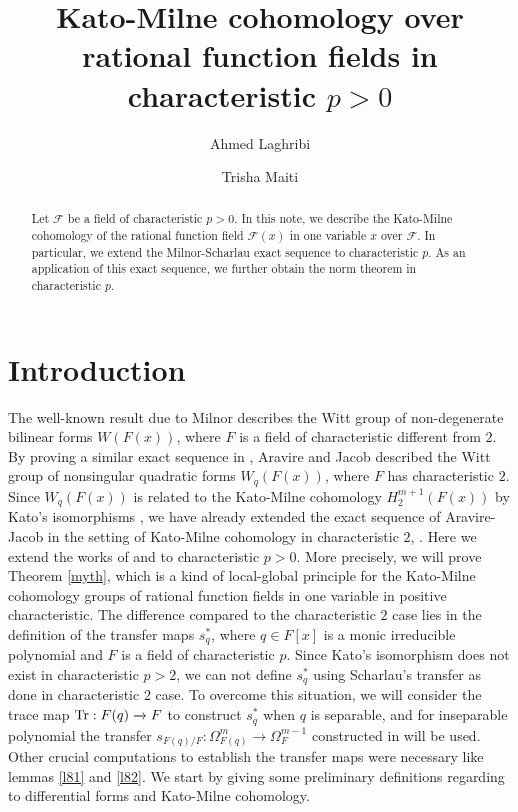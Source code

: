 \documentclass[times,10pt]{amsart}
\date{}
\title{Kato-Milne cohomology over rational function fields in characteristic $p>0$}
\author{Ahmed Laghribi}
\author{Trisha Maiti}
\newcommand{\F}{\ensuremath{\mathcal{F}}}
\begin{document}
\maketitle

\begin{abstract}
     Let $\F$ be a field 
 of characteristic $p>0$. In this note, we describe the Kato-Milne cohomology of  the  rational function field $\F(x)$ in one variable   $x$ over $\F$.  In particular, we extend  the  Milnor-Scharlau exact sequence \cite[Theorem 5.2]{Laghribi-Maiti}  to  characteristic $p$. As an application of this exact sequence, we further obtain  the norm theorem \cite[Theorem A.3]{Appendix} in characteristic $p$.
\end{abstract}



  



  
\section{Introduction}\label{s1}
   { The well-known  result \cite[Theorem 5.3]{M} due to Milnor describes the Witt group of non-degenerate bilinear forms $W(F(x))$, where  $F$ is  a field of  characteristic  different from  $2$.  By proving a similar exact sequence in \cite[Theorem 6.2]{AJ}, Aravire and Jacob  described the Witt group of nonsingular quadratic forms $W_q(F(x))$, where  $F$ has characteristic  $2$.  Since $W_q(F(x))$ is   related to  the Kato-Milne cohomology $ H_2^{m+1}(F(x))$ by Kato's isomorphisms \cite[equation (1.2)]{ex},  we  have already  extended the exact sequence of  Aravire-Jacob in the setting of Kato-Milne cohomology in characteristic $2$, \cite[Theorem 5.2]{Laghribi-Maiti}.  Here we extend  the works of  
      \cite{ex} and \cite{Laghribi-Maiti} to characteristic $p>0$.}  {More precisely, we will prove} Theorem \ref{myth}, which is a kind of local-global principle for the Kato-Milne cohomology groups of rational function fields in one variable in  positive characteristic.  {The difference compared to the characteristic $2$ case lies in the definition of the transfer maps $ s_q^*$, where $q\in F[x]$ is a monic irreducible polynomial and  $F$ is a field of characteristic $p$.}  Since Kato's isomorphism \cite[equation (1.2)]{ex} does not exist in characteristic  $p>2$, we can not define $s_q^*$ using Scharlau's transfer as done {in characteristic $2$ case}. {To overcome this situation, we will consider the trace map ${\rm Tr}: F(q)\xrightarrow{} F$ to construct $s_q^*$ when $q$ is separable, and for inseparable polynomial the transfer  $s_{F(q)/F}: \Omega_{F(q)}^{m}\xrightarrow{} \Omega_{F}^{m-1}$ constructed in \cite[Proposition 3.4]{ALO} will be used}. {Other crucial computations to establish the transfer maps were necessary like lemmas \ref{l81} and \ref{l82}.} We start by giving some preliminary  definitions regarding to differential forms and  Kato-Milne cohomology.
\end{document}
